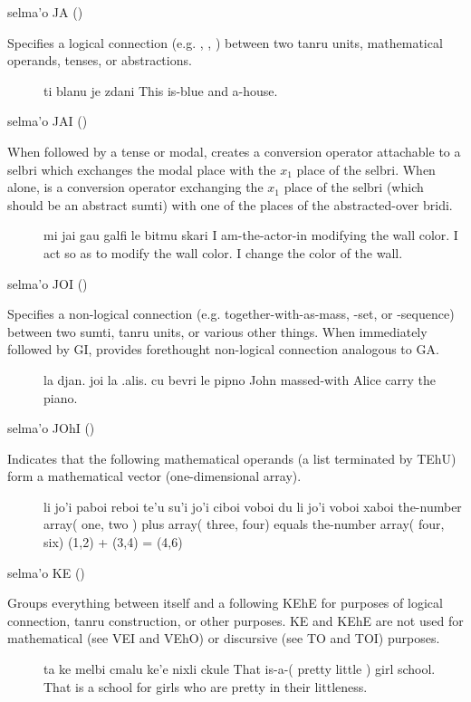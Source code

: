 selma'o JA () 

Specifies a logical connection (e.g. , ,
    ) between two tanru units, mathematical operands, tenses,
    or abstractions.
\begin{description}
\item[] ti blanu je zdani This is-blue and a-house.
\end{description}

selma'o JAI () 

When followed by a tense or modal, creates a conversion
    operator attachable to a selbri which exchanges the modal place
    with the $x_1$ place of the selbri. When alone, is a conversion
    operator exchanging the $x_1$ place of the selbri (which should be
    an abstract sumti) with one of the places of the
    abstracted-over bridi.
\begin{description}
\item[] mi jai gau galfi le bitmu skari I am-the-actor-in modifying the wall color. I act so as to modify the wall color. I change the color of the wall.
\end{description}

selma'o JOI () 

Specifies a non-logical connection (e.g.
    together-with-as-mass, -set, or -sequence) between two sumti,
    tanru units, or various other things. When immediately followed
    by GI, provides forethought non-logical connection analogous to
    GA.
\begin{description}
\item[] la djan. joi la .alis. cu bevri le pipno John massed-with Alice carry the piano.
\end{description}

selma'o JOhI () 

Indicates that the following mathematical operands (a list
    terminated by TEhU) form a mathematical vector (one-dimensional
    array).
\begin{description}
\item[] li jo'i paboi reboi te'u su'i jo'i ciboi voboi du li jo'i voboi xaboi the-number array( one, two ) plus array( three, four) equals the-number array( four, six) (1,2) + (3,4) = (4,6)
\end{description}

selma'o KE () 

Groups everything between itself and a following KEhE for
    purposes of logical connection, tanru construction, or other
    purposes. KE and KEhE are not used for mathematical (see VEI
    and VEhO) or discursive (see TO and TOI) purposes.
\begin{description}
\item[] ta ke melbi cmalu ke'e nixli ckule That is-a-( pretty little ) girl school. That is a school for girls who are pretty in their littleness.
\end{description}

